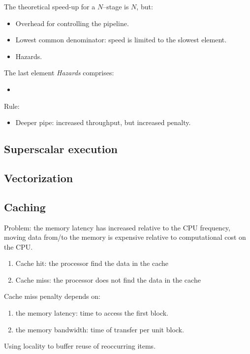 \documentclass{article}
\begin{document}
The theoretical speed-up for a $N$--stage is $N$, but:
\begin{itemize}
\item Overhead for controlling the pipeline.
\item Lowest common denominator: speed is limited to the slowest element.
\item Hazards.
\end{itemize}

The last element \textit{Hazards} comprises:
\begin{itemize}
\item 
\end{itemize}

Rule:
\begin{itemize}
\item Deeper pipe: increased throughput, but increased penalty.
\end{itemize}

\subsection{Superscalar execution}

\subsection{Vectorization}

\subsection{Caching}

Problem: the memory latency has increased relative to the CPU frequency, moving data from/to the memory is expensive relative to computational cost on the CPU.


\begin{enumerate}
\item Cache hit: the processor find the data in the cache
\item Cache miss: the processor does not find the data in the cache
\end{enumerate}

Cache miss penalty depends on:
\begin{enumerate}
\item the memory latency: time to access the first block.
\item the memory bandwidth: time of transfer per unit block.
\end{enumerate}

Using locality to buffer reuse of reoccurring items.
\end{document}
